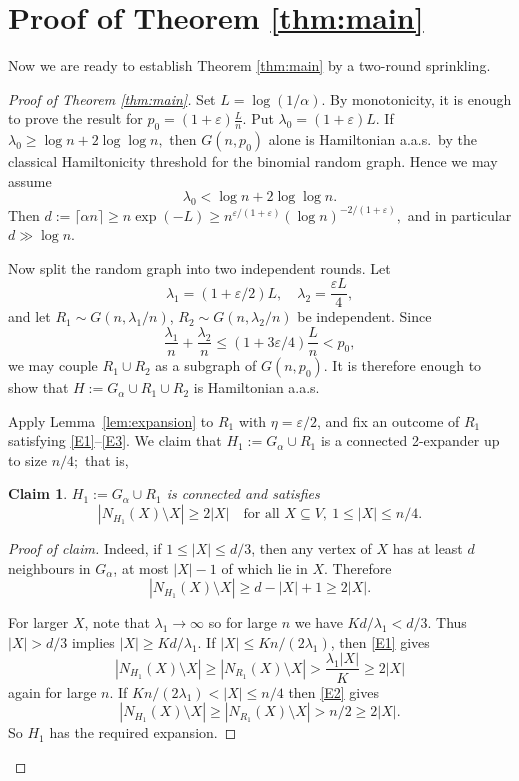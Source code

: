 \documentclass[11pt,reqno]{amsart}
\newenvironment{poc}{\begin{proof}[Proof of claim]\renewcommand*{\qedsymbol}{$\blacksquare$}}{\end{proof}}
\newtheorem{claim}[theorem]{Claim}
\theoremstyle{definition}
\theoremstyle{remark}
\renewcommand\le{\leqslant}
\renewcommand\ge{\geqslant}
\begin{document}
\medskip

\section{Proof of Theorem \ref{thm:main}}\label{sec:proof}

Now we are ready to establish Theorem \ref{thm:main} by a two-round sprinkling.

\begin{proof}[Proof of Theorem \ref{thm:main}]
Set $L=\log(1/\alpha)$. By monotonicity, it is enough to prove the result for $p_{0}=(1+\varepsilon)\frac{L}{n}$. Put $\lambda_{0}=(1+\varepsilon)L.$ If $\lambda_{0}\ge \log n+2 \log \log n,$ then $G(n,p_{0})$ alone is Hamiltonian a.a.s.\ by the classical Hamiltonicity threshold for the binomial random graph. Hence we may assume
$$\lambda_{0}<\log n+2 \log \log n.$$
Then $d := \lceil\alpha n\rceil \ge n \exp(-L) \ge n^{\varepsilon/(1+\varepsilon)}(\log n)^{-2/(1+\varepsilon)},$ and in particular $d\gg \log n.$

Now split the random graph into two independent rounds. Let
$$\lambda_{1}=(1+\varepsilon/2)L, \quad \lambda_{2}=\frac{\varepsilon L}{4},$$
and let $R_{1}\sim G(n,\lambda_{1}/n)$, $R_{2}\sim G(n,\lambda_{2}/n)$ be independent. Since
$$\frac{\lambda_{1}}{n}+\frac{\lambda_{2}}{n}\le(1+3\varepsilon/4)\frac{L}{n}<p_{0},$$
we may couple $R_{1}\cup R_{2}$ as a subgraph of $G(n,p_{0})$. It is therefore enough to show that $H:=G_\alpha\cup R_{1}\cup R_{2}$ is Hamiltonian a.a.s.

Apply Lemma~\ref{lem:expansion} to $R_{1}$ with $\eta=\varepsilon/2$, and fix an outcome of $R_{1}$ satisfying \ref{E1}--\ref{E3}. We claim that $H_{1}:=G_\alpha\cup R_{1}$ is a connected 2-expander up to size $n/4;$ that is,
\begin{claim}
$H_{1}:=G_\alpha\cup R_{1}$ is connected and satisfies
 $$|N_{H_{1}}(X)\setminus X|\ge 2|X| \quad \text{for all } X\subseteq V, \ 1\le|X|\le n/4.$$ 
\end{claim}



\begin{poc}
Indeed, if $1\le|X|\le d/3$, then any vertex of $X$ has at least $d$ neighbours in $G_\alpha$, at most $|X|-1$ of which lie in $X$. Therefore
$$|N_{H_{1}}(X)\setminus X|\ge d-|X|+1\ge 2|X|.$$

For larger $X$, note that $\lambda_{1}\rightarrow\infty$ so for large $n$ we have $Kd/\lambda_{1}<d/3$. Thus $|X|>d/3$ implies $|X|\ge Kd/\lambda_{1}$. If $|X|\le Kn/(2\lambda_{1})$, then \ref{E1} gives
$$|N_{H_{1}}(X)\setminus X|\ge|N_{R_{1}}(X)\setminus X|>\frac{\lambda_{1}|X|}{K}\ge 2|X|$$
again for large $n$. If $Kn/(2\lambda_{1})<|X|\le n/4$ then \ref{E2} gives
$$|N_{H_{1}}(X)\setminus X|\ge|N_{R_{1}}(X)\setminus X|>n/2\ge 2|X|.$$
So $H_{1}$ has the required expansion.


\end{poc}
\end{proof}
\end{document}
